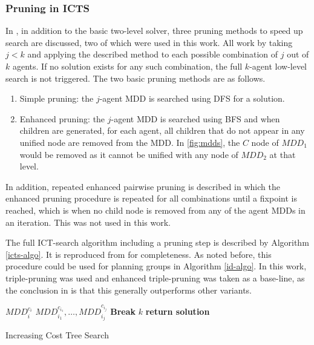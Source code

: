 \documentclass[english,10pt]{article}
\begin{document}
	\subsubsection{Pruning in ICTS}
	\label{pruning}
	In \cite{sharon2011}, in addition to the basic two-level solver, three pruning methods to speed up search are discussed, two of which were used in this work. All work by taking $j < k$ and applying the described method to each possible combination of $j$ out of $k$ agents. If no solution exists for any such combination, the full $k$-agent low-level search is not triggered. The two basic pruning methods are as follows.
	\begin{enumerate}
		\item Simple pruning: the $j$-agent MDD is searched using DFS for a solution.
		\item Enhanced pruning: the $j$-agent MDD is searched using BFS and when children are generated, for each agent, all children that do not appear in any unified node are removed from the MDD. In \ref{fig:mdds}, the $C$ node of $MDD_1$ would be removed as it cannot be unified with any node of $MDD_2$ at that level. 
	\end{enumerate}
	In addition, repeated enhanced pairwise pruning is described in which the enhanced pruning procedure is repeated for all combinations until a fixpoint is reached, which is when no child node is removed from any of the agent MDDs in an iteration. This was not used in this work. 
	
	The full ICT-search algorithm including a pruning step is described by Algorithm \ref{icts-algo}. It is reproduced from \cite{sharon2011} for completeness. As noted before, this procedure could be used for planning groups in Algorithm \ref{id-algo}. In this work, triple-pruning was used and enhanced triple-pruning was taken as a base-line, as the conclusion in \cite{sharon2011} is that this generally outperforms other variants.
	\begin{algorithm}
		\begin{algorithmic}[1]
			\State {}
			 $MDD_i^{c_i}$
			\EndFor
			\State {}$MDD_{i_1}^{c_{i_1}},\ldots,MDD_{i_j}^{c_{i_j}}$
			\State \textbf{Break}
			\EndIf
			\EndFor
			\State {}$k$
			\State \textbf{return solution}
			\EndIf
			\EndFor
			
			\EndProcedure
		\end{algorithmic}
		\caption{Increasing Cost Tree Search}
		\label{icts-algo}
	\end{algorithm}
\end{document}
